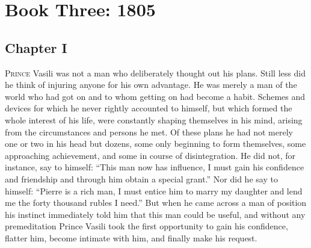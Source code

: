 \part*{Book Three: 1805}


\chapter*{Chapter I}
\ifaudio
{} 
\fi

\lettrine[lines=2, loversize=0.3, lraise=0]{\initfamily P}{rince }
Vasili was not a man who deliberately thought out his
plans.  Still less did he think of injuring anyone for his own
advantage. He was merely a man of the world who had got on and to
whom getting on had become a habit. Schemes and devices for which
he never rightly accounted to himself, but which formed the whole
interest of his life, were constantly shaping themselves in his
mind, arising from the circumstances and persons he met. Of these
plans he had not merely one or two in his head but dozens, some
only beginning to form themselves, some approaching achievement,
and some in course of disintegration. He did not, for instance,
say to himself: ``This man now has influence, I must gain his
confidence and friendship and through him obtain a special
grant.'' Nor did he say to himself: ``Pierre is a rich man, I
must entice him to marry my daughter and lend me the forty
thousand rubles I need.''  But when he came across a man of
position his instinct immediately told him that this man could be
useful, and without any premeditation Prince Vasili took the
first opportunity to gain his confidence, flatter him, become
intimate with him, and finally make his request.

